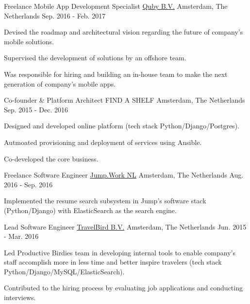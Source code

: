 \begin{cventries}
  \cventry
    {Freelance Mobile App Development Specialist} %
    {\href{https://www.quby.com/}{Quby B.V.}} %
    {Amsterdam, The Netherlands} %
    {Sep. 2016 - Feb. 2017} %
    {
      \begin{cvitems} %
        \item {Devised the roadmap and architectural vision regarding the future of company's mobile solutions.}
        \item {Supervised the  development of solutions by an offshore team.}
        \item {Was responsible for hiring and building an in-house team to make the next generation of company's mobile apps.}
      \end{cvitems}
    }

  \cventry
    {Co-founder \& Platform  Architect} %
    {FIND A SHELF} %
    {Amsterdam, The Netherlands} %
    {Sep. 2015 - Dec. 2016} %
    {
      \begin{cvitems} %
        \item {Designed and developed online platform (tech stack Python/Django/Postgres).}
        \item {Autmoated provisioning and deployment of services using Ansible.}
        \item {Co-developed the core business.}
      \end{cvitems}
    }

  \cventry
    {Freelance Software Engineer} %
    {\href{https://jump.work/}{Jump.Work NL}} %
    {Amsterdam, The Netherlands} %
    {Aug. 2016 - Sep. 2016} %
    {
      \begin{cvitems} %
        \item {Implemented the resume search subsystem in Jump's software stack (Python/Django) with ElasticSearch as the search engine.}
      \end{cvitems}
    }

  \cventry
    {Lead Software Engineer} %
    {\href{https://travelbird.nl/}{TravelBird B.V.}} %
    {Amsterdam, The Netherlands} %
    {Jun. 2015 - Mar. 2016} %
    {
      \begin{cvitems} %
        \item {Led Productive Birdies team in developing internal tools to enable company's staff accomplish more in less time and better inspire travelers (tech stack Python/Django/MySQL/ElasticSearch).}
        \item {Contributed to the hiring process by evaluating job applications and conducting interviews.}
      \end{cvitems}
    }


\end{cventries}
